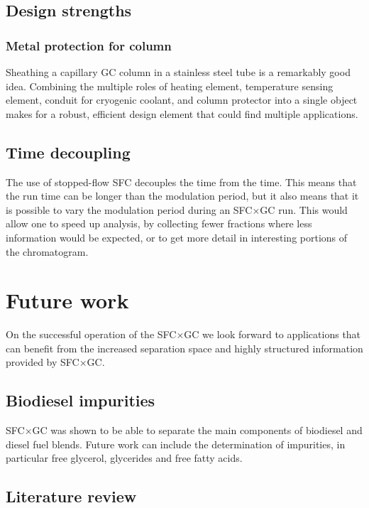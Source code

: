 \subsection{Design strengths}

\subsubsection{Metal protection for column}

Sheathing a capillary GC column in a stainless steel tube is a remarkably good
idea. Combining the multiple roles of heating element, temperature sensing
element, conduit for cryogenic coolant, and column protector into a single
object makes for a robust, efficient design element that could find multiple
applications.

\subsection{Time decoupling}

The use of stopped-flow SFC decouples the \oneD time from the \twoD time. This
means that the \twoD run time can be longer than the modulation period, but it
also means that it is possible to vary the modulation period during an SFC×GC
run. This would allow one to speed up analysis, by collecting fewer fractions
where less information would be expected, or to get more detail in interesting
portions of the \oneD chromatogram.

\section{Future work}

On the successful operation of the SFC×GC we look forward to applications that
can benefit from the increased separation space and highly structured
information provided by SFC×GC.

\subsection{Biodiesel impurities}

SFC×GC was shown to be able to separate the main components of biodiesel and
diesel fuel blends. Future work can include the determination of impurities, in
particular free glycerol, glycerides and free fatty acids.

\subsection{Literature review}

